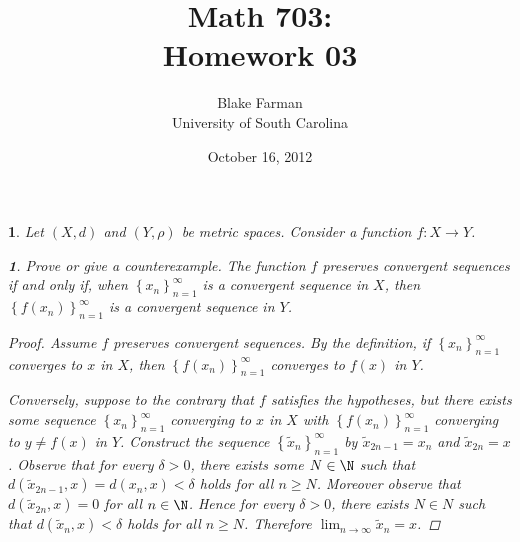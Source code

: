\documentclass[12pt]{amsart}
\author{Blake Farman\\University of South Carolina}
\title{Math 703:\\Homework 03}
\date{October 16, 2012}
\begin{document}
\maketitle

\providecommand{\norm}[1]{\lVert#1\rVert}
\renewcommand{\qedsymbol}{\ensuremath{\blacksquare}}
\newcommand{\abs}[1]{\left| #1 \right|}
\newcommand{\dist}[2]{\operatorname{dist}\left(#1,#2\right)}

\newtheorem{setup}{}
\setcounter{setup}{12}
\newtheorem{ex}{}[setup]
\newtheorem{lem}{Lemma}

\begin{setup}
  Let $(X, d)$ and $(Y,\rho)$ be metric spaces.
  Consider a function $f \colon X \rightarrow Y$.
  \begin{ex}
    Prove or give a counterexample.
    The function $f$ preserves convergent sequences if and only if, when $\left\{x_n\right\}_{n=1}^\infty$ is a convergent sequence in $X$, then $\left\{f(x_n)\right\}_{n=1}^\infty$ is a convergent sequence in $Y$.
    \begin{proof}
      Assume $f$ preserves convergent sequences.
      By the definition, if $\left\{x_n\right\}_{n=1}^\infty$ converges to $x$ in $X$, then $\left\{f(x_n)\right\}_{n=1}^\infty$ converges to $f(x)$ in $Y$.
      
      Conversely, suppose to the contrary that $f$ satisfies the hypotheses, but there exists some sequence $\left\{x_n\right\}_{n=1}^\infty$ converging to $x$ in $X$ with $\left\{f(x_n)\right\}_{n=1}^\infty$ converging to $y \not = f(x)$ in $Y$.
      Construct the sequence $\left\{\tilde{x}_n\right\}_{n=1}^\infty$ by $\tilde{x}_{2n-1} = x_n$ and $\tilde{x}_{2n} = x$.
      Observe that for every $\delta > 0$, there exists some $N \in \N$ such that $d(\tilde{x}_{2n-1},x) = d(x_n, x) < \delta$ holds for all $n \geq N$.
      Moreover observe that $d(\tilde{x}_{2n}, x) = 0$ for all $n \in \N$.
      Hence for every $\delta > 0$, there exists $N \in N$ such that $d(\tilde{x}_n, x) < \delta$ holds for all $n \geq N$.
      Therefore $\lim_{n\rightarrow\infty} \tilde{x}_n = x$.
      

\end{proof}
\end{ex}
\end{setup}
\end{document}
